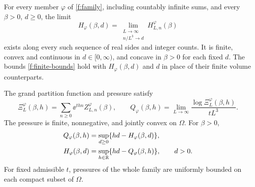 \begin{proposition}
\label{f:thermodynamics}
For every member $\varphi$ of \eqref{f:family}, including countably
infinite sums, and every $\beta>0$, $d\ge0$, the limit
\begin{equation}\label{f:canonical-limit}
 H_\varphi(\beta,d)
 =\lim_{\substack{L\to\infty\\ n/L^3\to d}}
      H^\varphi_{L,n}(\beta)
\end{equation}
exists along every such sequence of real sides and integer counts.
It is finite, convex and continuous in $d\in[0,\infty)$, and concave
in $\beta>0$ for each fixed $d$.  The bounds \eqref{f:finite-bounds}
hold with $H_\varphi(\beta,d)$ and $d$ in place of their finite volume
counterparts.

The grand partition function and pressure satisfy
\begin{equation}\label{f:pressure-definition}
 \Xi^\varphi_L(\beta,h)
 =\sum_{n\ge0}\ee^{thn}Z^\varphi_{L,n}(\beta),
 \qquad
 Q_\varphi(\beta,h)
 =\lim_{L\to\infty}\frac{\log\Xi^\varphi_L(\beta,h)}{tL^3}.
\end{equation}
The pressure is finite, nonnegative, and jointly convex on $\Omega$.
For $\beta>0$,
\begin{equation}\label{f:duality}
 \begin{split}
 Q_\varphi(\beta,h)
   &=\sup_{d\ge0}\{hd-H_\varphi(\beta,d)\},\\
 H_\varphi(\beta,d)
   &=\sup_{h\in\mathbb R}\{hd-Q_\varphi(\beta,h)\},\qquad d>0.
 \end{split}
\end{equation}
For fixed admissible $t$, pressures of the whole family are uniformly
bounded on each compact subset of $\Omega$.
\end{proposition}

